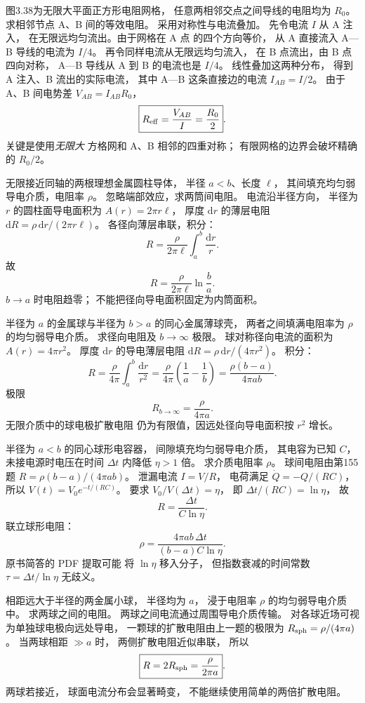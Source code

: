 图3.38为无限大平面正方形电阻网格，
任意两相邻交点之间导线的电阻均为
$R_0$。求相邻节点 A、B 间的等效电阻。
\exsolution
采用对称性与电流叠加。
先令电流 $I$ 从 A 注入，
在无限远均匀流出。由于网格在 A 点
的四个方向等价，
从 A 直接流入 A—B 导线的电流为
$I/4$。
再令同样电流从无限远均匀流入，
在 B 点流出，由 B 点四向对称，
A—B 导线从 A 到 B 的电流也是 $I/4$。
线性叠加这两种分布，
得到 A 注入、B 流出的实际电流，
其中 A—B 这条直接边的电流
$I_{AB}=I/2$。
由于 A、B 间电势差
$V_{AB}=I_{AB}R_0$，
\[
\boxed{R_{\rm eff}=\frac{V_{AB}}{I}
=\frac{R_0}{2}}.
\]
\excheck 关键是使用\emph{无限大}
方格网和 A、B 相邻的四重对称；
有限网格的边界会破坏精确的 $R_0/2$。

无限接近同轴的两根理想金属圆柱导体，
半径 $a<b$、长度 $\ell$，
其间填充均匀弱导电介质，电阻率 $\rho$。
忽略端部效应，求两筒间电阻。
\exsolution
电流沿半径方向，
半径为 $r$ 的圆柱面导电面积为
$A(r)=2\pi r\ell$，
厚度 $\mathrm dr$ 的薄层电阻
$\mathrm dR=\rho\,\mathrm dr/(2\pi r\ell)$。
各径向薄层串联，积分：
\[
R=\frac{\rho}{2\pi\ell}
\int_a^b\frac{\mathrm dr}r.
\]
故
\[
\boxed{R=\frac{\rho}{2\pi\ell}\ln\frac ba}.
\]
\excheck $b\to a$ 时电阻趋零；
不能把径向导电面积固定为内筒面积。

半径为 $a$ 的金属球与半径为
$b>a$ 的同心金属薄球壳，
两者之间填满电阻率为 $\rho$
的均匀弱导电介质。
求径向电阻及 $b\to\infty$ 极限。
\exsolution
球对称径向电流的面积为
$A(r)=4\pi r^2$。
厚度 $\mathrm dr$ 的导电薄层电阻
$\mathrm dR=\rho\,\mathrm dr/(4\pi r^2)$。
积分：
\[
R=\frac{\rho}{4\pi}\int_a^b\frac{\mathrm dr}{r^2}
=\boxed{\frac{\rho}{4\pi}
\left(\frac1a-\frac1b\right)
=\frac{\rho(b-a)}{4\pi ab}}.
\]
极限
\[
\boxed{R_{b\to\infty}=\frac{\rho}{4\pi a}}.
\]
\excheck 无限介质中的球电极扩散电阻
仍为有限值，因远处径向导电面积按 $r^2$ 增长。

半径为 $a<b$ 的同心球形电容器，
间隙填充均匀弱导电介质，
其电容为已知 $C$，
未接电源时电压在时间 $\Delta t$
内降低 $\eta>1$ 倍。
求介质电阻率 $\rho$。
\exsolution
球间电阻由第155题
$R=\rho(b-a)/(4\pi ab)$。
泄漏电流
$I=V/R$，
电荷满足
$\dot Q=-Q/(RC)$，
所以
$V(t)=V_0e^{-t/(RC)}$。
要求
$V_0/V(\Delta t)=\eta$，
即
$\Delta t/(RC)=\ln\eta$，
故
\[
R=\frac{\Delta t}{C\ln\eta}.
\]
联立球形电阻：
\[
\boxed{\rho=
\frac{4\pi ab\,\Delta t}
{(b-a)C\ln\eta}}.
\]
\excheck 原书简答的 PDF 提取可能
将 $\ln\eta$ 移入分子，
但指数衰减的时间常数
$\tau=\Delta t/\ln\eta$ 无歧义。

相距远大于半径的两金属小球，
半径均为 $a$，
浸于电阻率 $\rho$ 的均匀弱导电介质中。
求两球之间的电阻。
\exsolution
两球之间电流通过周围导电介质传输。
对各球近场可视为单独球电极向远处导电，
一颗球的扩散电阻由上一题的极限为
$R_{\rm sph}=\rho/(4\pi a)$。
当两球相距 $\gg a$ 时，
两侧扩散电阻近似串联，
所以
\[
\boxed{R=2R_{\rm sph}=
\frac{\rho}{2\pi a}}.
\]
\excheck 两球若接近，
球面电流分布会显著畸变，
不能继续使用简单的两倍扩散电阻。

